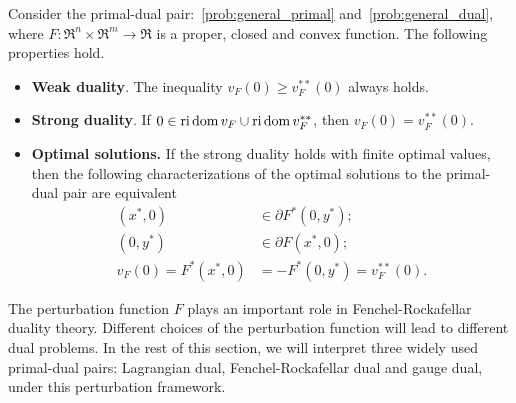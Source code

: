 \begin{theorem} Consider the primal-dual pair:~\eqref{prob:general_primal} and~\eqref{prob:general_dual}, where $F: \Re^n \times \Re^m \to \Re$ is a proper, closed and convex function. The following properties hold. 
    \begin{itemize}
        \item \textbf{Weak duality}. The inequality $v_F(0) \geq v_F^{**}(0)$ always holds. 
        \item \textbf{Strong duality}. If $0 \in \operatorname{ri}\operatorname{dom} v_F \cup \operatorname{ri}\operatorname{dom} v_F^{**}$, then $v_F(0) = v_F^{**}(0)$. 
        \item \textbf{Optimal solutions.} If the strong duality holds with finite optimal values, then the following characterizations of the optimal solutions to the primal-dual pair are equivalent
            \begin{align}
                (x^*, 0) &\in \partial F^*(0,y^*); \\
                (0, y^*) &\in \partial F(x^*,0); \\
                v_F(0) = F^*(x^*, 0) &= -F^*(0,y^*) = v_F^{**}(0).
            \end{align}
    \end{itemize}
\end{theorem}

The perturbation function $F$ plays an important role in Fenchel-Rockafellar duality theory. Different choices of the perturbation function will lead to different dual problems. In the rest of this section, we will interpret three widely used primal-dual pairs: Lagrangian dual, Fenchel-Rockafellar dual and gauge dual, under this perturbation framework.  


